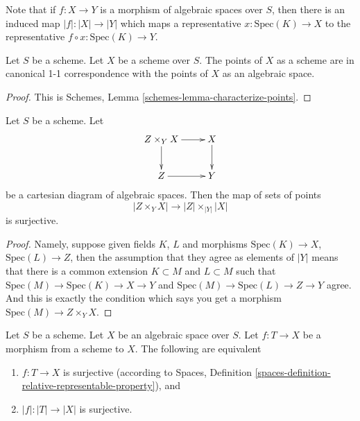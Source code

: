\noindent
Note that if $f : X \to Y$ is a morphism of algebraic spaces
over $S$, then there is an induced map $|f| : |X| \to |Y|$ which
maps a representative $x : \text{Spec}(K) \to X$ to the representative
$f \circ x : \text{Spec}(K) \to Y$.

\begin{lemma}
\label{lemma-scheme-points}
Let $S$ be a scheme. Let $X$ be a scheme over $S$.
The points of $X$ as a scheme are in canonical 1-1 correspondence
with the points of $X$ as an algebraic space.
\end{lemma}

\begin{proof}
This is Schemes, Lemma \ref{schemes-lemma-characterize-points}.
\end{proof}

\begin{lemma}
\label{lemma-points-cartesian}
Let $S$ be a scheme. Let
$$
\xymatrix{
Z \times_Y X \ar[r] \ar[d] & X \ar[d] \\
Z \ar[r] & Y
}
$$
be a cartesian diagram of algebraic spaces. Then the map of sets
of points
$$
|Z \times_Y X|
\longrightarrow
|Z| \times_{|Y|} |X|
$$
is surjective.
\end{lemma}

\begin{proof}
Namely, suppose given fields $K$, $L$ and morphisms
$\text{Spec}(K) \to X$, $\text{Spec}(L) \to Z$, then the
assumption that they agree as elements of $|Y|$ means that
there is a common extension $K \subset M$ and $L \subset M$
such that
$\text{Spec}(M) \to \text{Spec}(K) \to X \to Y$ and
$\text{Spec}(M) \to \text{Spec}(L) \to Z \to Y$ agree.
And this is exactly the condition which says you get a
morphism $\text{Spec}(M) \to Z \times_Y X$.
\end{proof}

\begin{lemma}
\label{lemma-characterize-surjective}
Let $S$ be a scheme.
Let $X$ be an algebraic space over $S$.
Let $f : T \to X$ be a morphism from a scheme to $X$.
The following are equivalent
\begin{enumerate}
\item $f : T \to X$ is surjective (according to
Spaces, Definition \ref{spaces-definition-relative-representable-property}),
and
\item $|f| : |T| \to |X|$ is surjective.
\end{enumerate}
\end{lemma}

